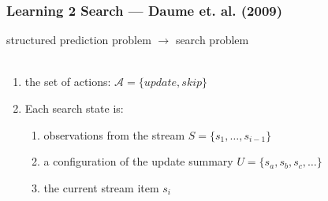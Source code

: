\documentclass{beamer}
\begin{document}
\begin{frame}
    \frametitle{Learning 2 Search --- Daume et. al. (2009)}

    structured prediction problem $\rightarrow$ search problem\\
~\\

    \begin{enumerate}
        \item the set of actions: $\mathcal{A} = \{update, skip \}$
        \item Each search state is:
            \begin{enumerate}
                \item observations from the stream $S=\{s_1, \ldots, s_{i-1}\}$
                \item a configuration of the update summary 
                        $U = \{s_a, s_b, s_c, \ldots\}$
                \item the current stream item $s_i$
            \end{enumerate}
    \end{enumerate}

\end{frame}

\begin{frame}
    
\end{frame}
\end{document}
